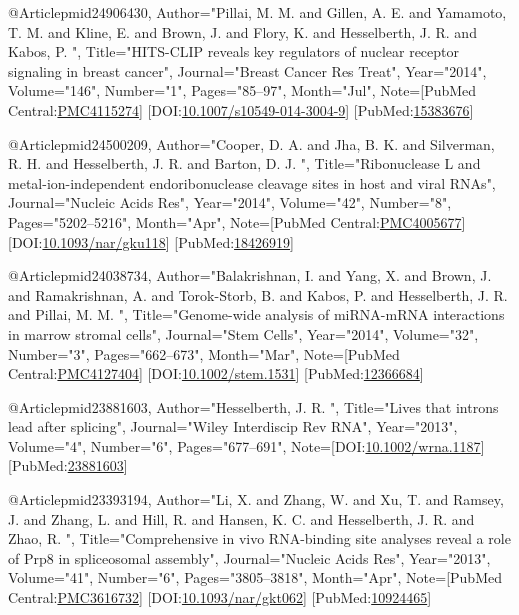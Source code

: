 @Article{pmid24906430,
   Author="Pillai, M. M.  and Gillen, A. E.  and Yamamoto, T. M.  and Kline, E.  and Brown, J.  and Flory, K.  and Hesselberth, J. R.  and Kabos, P. ",
   Title="{{H}{I}{T}{S}-{C}{L}{I}{P} reveals key regulators of nuclear receptor signaling in breast cancer}",
   Journal="Breast Cancer Res Treat",
   Year="2014",
   Volume="146",
   Number="1",
   Pages="85--97",
   Month="Jul",
   Note={[PubMed Central:\href{https://www.ncbi.nlm.nih.gov/pmc/articles/PMC4115274}{PMC4115274}] [DOI:\href{https://dx.doi.org/10.1007/s10549-014-3004-9}{10.1007/s10549-014-3004-9}] [PubMed:\href{https://www.ncbi.nlm.nih.gov/pubmed/15383676}{15383676}] }
}

@Article{pmid24500209,
   Author="Cooper, D. A.  and Jha, B. K.  and Silverman, R. H.  and Hesselberth, J. R.  and Barton, D. J. ",
   Title="{{R}ibonuclease {L} and metal-ion-independent endoribonuclease cleavage sites in host and viral {R}{N}{A}s}",
   Journal="Nucleic Acids Res",
   Year="2014",
   Volume="42",
   Number="8",
   Pages="5202--5216",
   Month="Apr",
   Note={[PubMed Central:\href{https://www.ncbi.nlm.nih.gov/pmc/articles/PMC4005677}{PMC4005677}] [DOI:\href{https://dx.doi.org/10.1093/nar/gku118}{10.1093/nar/gku118}] [PubMed:\href{https://www.ncbi.nlm.nih.gov/pubmed/18426919}{18426919}] }
}

@Article{pmid24038734,
   Author="Balakrishnan, I.  and Yang, X.  and Brown, J.  and Ramakrishnan, A.  and Torok-Storb, B.  and Kabos, P.  and Hesselberth, J. R.  and Pillai, M. M. ",
   Title="{{G}enome-wide analysis of mi{R}{N}{A}-m{R}{N}{A} interactions in marrow stromal cells}",
   Journal="Stem Cells",
   Year="2014",
   Volume="32",
   Number="3",
   Pages="662--673",
   Month="Mar",
   Note={[PubMed Central:\href{https://www.ncbi.nlm.nih.gov/pmc/articles/PMC4127404}{PMC4127404}] [DOI:\href{https://dx.doi.org/10.1002/stem.1531}{10.1002/stem.1531}] [PubMed:\href{https://www.ncbi.nlm.nih.gov/pubmed/12366684}{12366684}] }
}

@Article{pmid23881603,
   Author="Hesselberth, J. R. ",
   Title="{{L}ives that introns lead after splicing}",
   Journal="Wiley Interdiscip Rev RNA",
   Year="2013",
   Volume="4",
   Number="6",
   Pages="677--691",
   Note={[DOI:\href{https://dx.doi.org/10.1002/wrna.1187}{10.1002/wrna.1187}] [PubMed:\href{https://www.ncbi.nlm.nih.gov/pubmed/23881603}{23881603}] }
}

@Article{pmid23393194,
   Author="Li, X.  and Zhang, W.  and Xu, T.  and Ramsey, J.  and Zhang, L.  and Hill, R.  and Hansen, K. C.  and Hesselberth, J. R.  and Zhao, R. ",
   Title="{{C}omprehensive in vivo {R}{N}{A}-binding site analyses reveal a role of {P}rp8 in spliceosomal assembly}",
   Journal="Nucleic Acids Res",
   Year="2013",
   Volume="41",
   Number="6",
   Pages="3805--3818",
   Month="Apr",
   Note={[PubMed Central:\href{https://www.ncbi.nlm.nih.gov/pmc/articles/PMC3616732}{PMC3616732}] [DOI:\href{https://dx.doi.org/10.1093/nar/gkt062}{10.1093/nar/gkt062}] [PubMed:\href{https://www.ncbi.nlm.nih.gov/pubmed/10924465}{10924465}] }
}


